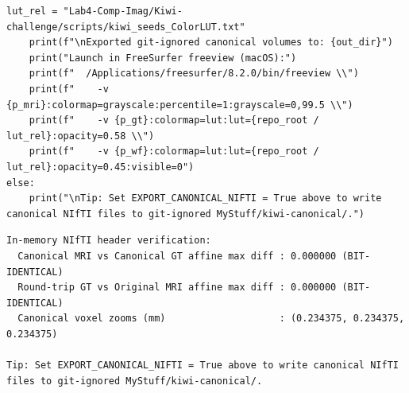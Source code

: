 \documentclass[10pt,a4paper]{article}
\renewcommand{\_}{\origunderscore\allowbreak}
\begin{document}
\begin{codebox}
\begin{lstlisting}[style=pybmed]
    lut_rel = "Lab4-Comp-Imag/Kiwi-challenge/scripts/kiwi_seeds_ColorLUT.txt"
    print(f"\nExported git-ignored canonical volumes to: {out_dir}")
    print("Launch in FreeSurfer freeview (macOS):")
    print(f"  /Applications/freesurfer/8.2.0/bin/freeview \\")
    print(f"    -v {p_mri}:colormap=grayscale:percentile=1:grayscale=0,99.5 \\")
    print(f"    -v {p_gt}:colormap=lut:lut={repo_root / lut_rel}:opacity=0.58 \\")
    print(f"    -v {p_wf}:colormap=lut:lut={repo_root / lut_rel}:opacity=0.45:visible=0")
else:
    print("\nTip: Set EXPORT_CANONICAL_NIFTI = True above to write canonical NIfTI files to git-ignored MyStuff/kiwi-canonical/.")
\end{lstlisting}
\end{codebox}
\begin{outbox}
\begin{lstlisting}[style=outbmed]
In-memory NIfTI header verification:
  Canonical MRI vs Canonical GT affine max diff : 0.000000 (BIT-IDENTICAL)
  Round-trip GT vs Original MRI affine max diff : 0.000000 (BIT-IDENTICAL)
  Canonical voxel zooms (mm)                    : (0.234375, 0.234375, 0.234375)

Tip: Set EXPORT_CANONICAL_NIFTI = True above to write canonical NIfTI files to git-ignored MyStuff/kiwi-canonical/.
\end{lstlisting}
\end{outbox}
\end{document}
